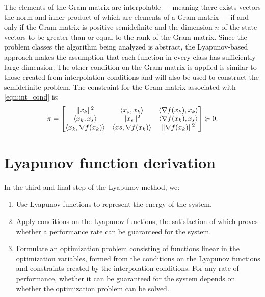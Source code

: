 The elements of the Gram matrix are interpolable --- meaning there exists vectors the norm and inner product of which are elements of a Gram matrix --- if and only if the Gram matrix is positive semidefinite and the dimension $n$ of the state vectors to be greater than or equal to the rank of the Gram matrix. Since the problem classes the algorithm being analyzed is abstract, the Lyapunov-based approach makes the assumption that each function in every class has sufficiently large dimension. The other condition on the Gram matrix is applied is similar to those created from interpolation conditions and will also be used to construct the semidefinite problem. The constraint for the Gram matrix associated with \eqref{eqn:int_cond} is:
\begin{equation} \label{eqn:trans_cond}
		\pi = \begin{bmatrix}\|x_k\|^2 & \langle x_s, x_k \rangle & \langle \nabla f(x_k), x_k \rangle \\ \langle x_k, x_s \rangle & \|x_s\|^2 & \langle \nabla f(x_k), x_s \rangle \\ \langle x_k, \nabla f(x_k) \rangle & \langle xs, \nabla f(x_k) \rangle & \|\nabla f(x_k)\|^2\end{bmatrix} \succcurlyeq 0.
	\end{equation}


\section{Lyapunov function derivation} \label{Lyapunov}
In the third and final step of the Lyapunov method, we:
\begin{enumerate}
	\item Use Lyapunov functions to represent the energy of the system.
	\item Apply conditions on the Lyapunov functions, the satisfaction of which proves whether a performance rate can be guaranteed for the system.
	\item Formulate an optimization problem consisting of functions linear in the optimization variables, formed from the conditions on the Lyapunov functions and constraints created by the interpolation conditions. For any rate of performance, whether it can be guaranteed for the system depends on whether the optimization problem can be solved.
\end{enumerate}

